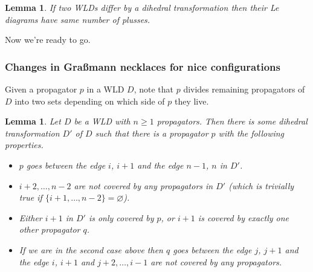 \documentclass[11pt]{article}
\newtheorem{lem}[thm]{Lemma}
\theoremstyle{remark}
\theoremstyle{definition}
\begin{document}
\begin{lem}\label{lem dihedral}
  If two WLDs differ by a dihedral transformation then their Le diagrams have same number of plusses.
\end{lem}

Now we're ready to go.

\subsubsection{Changes in Gra\ss mann necklaces for nice configurations}

Given a propagator $p$ in a WLD $D$, note that $p$ divides remaining propagators of $D$ into two sets depending on which side of $p$ they live.

\begin{lem}\label{lem good p}
  Let $D$ be a WLD with $n\geq 1$ propagators.  Then there is some dihedral transformation $D'$ of $D$ such that there is a propagator $p$ with the following properties.
  \begin{itemize}
  \item $p$ goes between the edge $i$, $i+1$ and the edge $n-1$, $n$ in $D'$.
  \item $i+2, \ldots, n-2$ are not covered by any propagators in $D'$ (which is trivially true if $\{i+1, \ldots, n-2\}=\varnothing$).
  \item Either $i+1$ in $D'$ is only covered by $p$, or $i+1$ is covered by exactly one other propagator $q$.
  \item If we are in the second case above then $q$ goes between the edge $j$, $j+1$ and the edge $i$, $i+1$ and $j+2, \ldots, i-1$ are not covered by any propagators.
  \end{itemize}
\end{lem}
\end{document}
